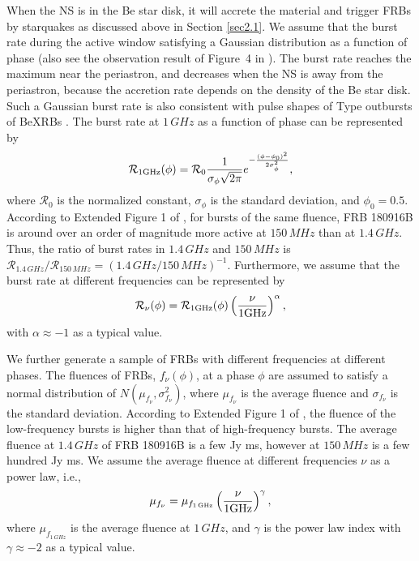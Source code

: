 \documentclass[twocolumn]{aastex62}
\begin{document}
When the NS is in the Be star disk, it will accrete the material and trigger FRBs by starquakes as discussed above in Section \ref{sec2.1}.
We assume that the burst rate during the active window satisfying a Gaussian distribution as a function of phase (also see the observation result of Figure~4 in \cite{pas20}). The burst rate reaches the maximum near the periastron, and decreases when the NS is away from the periastron, because the accretion rate depends on the density of the Be star disk.
Such a Gaussian burst rate is also consistent with pulse shapes of Type \uppercase\expandafter{} outbursts of BeXRBs \citep[e.g.,][]{wil02,bay08, wil08}.
The burst rate at $1\,\unit{GHz}$ as a function of phase can be represented by
\begin{eqnarray}
\mathcal R_{{\rm{1 GHz}}}({\rm{\phi}})=\mathcal R_0\frac{1}{\sigma_{\phi} \sqrt{2 \pi}} e^{-\frac{(\phi -\phi_0)^{2}}{2 \sigma_{\phi}^{2}}},
\end{eqnarray}
where $\mathcal R_0$ is the normalized constant, $\sigma_{\phi}$ is the standard deviation, and $\phi_0 =0.5$. 
According to Extended Figure 1 of \cite{pas20}, for bursts of the same fluence, FRB 180916B is around over an order of 
magnitude more active at $150\,\unit{MHz}$ than at $1.4\,\unit{GHz}$. 
Thus, the ratio of burst rates in $1.4\,\unit{GHz}$ and $150\,\unit{MHz}$ is $\mathcal R_{1.4\,\unit{GHz}}/\mathcal R_{150\,\unit{MHz}} = (1.4\,\unit{GHz}/150\,\unit{MHz})^{-1}$. 
Furthermore, we assume that the burst rate at different frequencies can be represented by
\begin{eqnarray}
\mathcal R_\nu(\phi)=\mathcal R_{{\rm{1 GHz}}}(\phi)\left(\frac{\nu}{\rm{1 GHz}}\right)^{\alpha},
\end{eqnarray}
with $\alpha \approx -1$ as a typical value.

We further generate a sample of FRBs with different frequencies at different phases. The fluences of FRBs, $f_{\nu}(\phi)$, at a phase $\phi$ are assumed to satisfy a normal distribution of $N(\mu_{f_{\nu}}, \sigma_{f_{\nu}}^2)$, where $\mu_{f_{\nu}}$ is the average fluence and $ \sigma_{f_{\nu}}$ is the standard deviation.
According to Extended Figure 1 of \cite{pas20}, the fluence of the low-frequency bursts is higher than that of high-frequency bursts. The average fluence at $1.4\,\unit{GHz}$ of FRB 180916B is a few Jy ms, however at  $150\,\unit{MHz}$ is a few hundred Jy ms.
We assume the average fluence at different frequencies $\nu$ as a power law, i.e.,
\begin{eqnarray}
\mu_{f_{\nu}} = \mu_{f_{1\,\unit{GHz}}}\left(\frac{\nu}{\rm{1 GHz}}\right)^{\gamma},
\end{eqnarray}
where $\mu_{f_{1\,\unit{GHz}}}$ is the average fluence at $1\,\unit{GHz}$, and $\gamma$ is the power law index with $\gamma \approx -2$ as a typical value.
\end{document}
